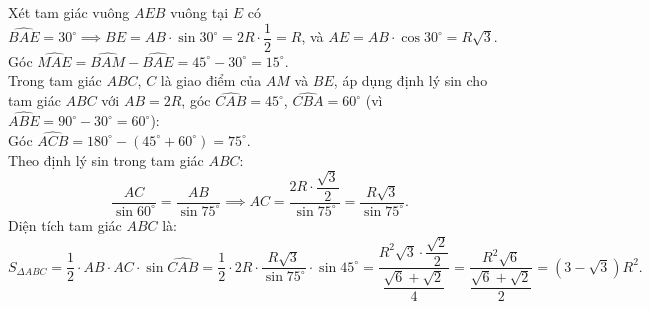 \begin{bt}
{\begin{enumerate}[a)]
	Xét tam giác vuông $AEB$ vuông tại $E$ có $\widehat{BAE} = 30^\circ \implies BE = AB \cdot \sin 30^\circ = 2R \cdot \dfrac{1}{2} = R$, và $AE = AB \cdot \cos 30^\circ = R\sqrt{3}$.\\
	Góc $\widehat{MAE} = \widehat{BAM} - \widehat{BAE} = 45^\circ - 30^\circ = 15^\circ$.\\
	Trong tam giác $ABC$, $C$ là giao điểm của $AM$ và $BE$, áp dụng định lý sin cho tam giác $ABC$ với $AB = 2R$, góc $\widehat{CAB} = 45^\circ$, $\widehat{CBA} = 60^\circ$ (vì $\widehat{ABE} = 90^\circ - 30^\circ = 60^\circ$):\\
	Góc $\widehat{ACB} = 180^\circ - (45^\circ + 60^\circ) = 75^\circ$.\\
	Theo định lý sin trong tam giác $ABC$:
	$$ \dfrac{AC}{\sin 60^\circ} = \dfrac{AB}{\sin 75^\circ} \implies AC = \dfrac{2R \cdot \dfrac{\sqrt{3}}{2}}{\sin 75^\circ} = \dfrac{R\sqrt{3}}{\sin 75^\circ}. $$
	Diện tích tam giác $ABC$ là:
	$$ S_{\Delta ABC} = \dfrac{1}{2} \cdot AB \cdot AC \cdot \sin \widehat{CAB} = \dfrac{1}{2} \cdot 2R \cdot \dfrac{R\sqrt{3}}{\sin 75^\circ} \cdot \sin 45^\circ = \dfrac{R^2\sqrt{3} \cdot \dfrac{\sqrt{2}}{2}}{\dfrac{\sqrt{6}+\sqrt{2}}{4}} = \dfrac{R^2\sqrt{6}}{\dfrac{\sqrt{6}+\sqrt{2}}{2}} = (3 - \sqrt{3})R^2. $$
\end{enumerate}
}
\end{bt}

